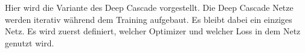 Hier wird die Variante des Deep Cascade vorgestellt. 
Die Deep Cascade Netze werden iterativ während dem Training aufgebaut. Es bleibt dabei ein einziges Netz. Es wird zuerst 
definiert, welcher Optimizer und welcher Loss in dem Netz genutzt wird. 


